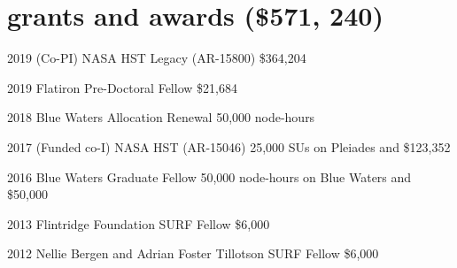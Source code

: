 \documentclass[]{luger-cv} %
\begin{document}

\section{grants and awards { \small (\$571, 240)}}

\begin{entrylist}

\entry
{2019}
{(Co-PI) NASA HST Legacy (AR-15800)}
{\$364,204}
{%
\vspace*{-0.75em}
}

\entry
{2019}
{Flatiron Pre-Doctoral Fellow}
{\$21,684}
{%
\vspace*{-0.75em}
}


\entry
{2018}
{Blue Waters Allocation Renewal}
{50,000 node-hours}
{%
\vspace*{-0.75em}
}


\entry
{2017}
{(Funded co-I) NASA HST (AR-15046)}
{25,000 SUs on Pleiades and \$123,352}
{%
\vspace*{-0.75em}
}


\entry
{2016}
{Blue Waters Graduate Fellow}
{50,000 node-hours on Blue Waters and \$50,000}
{%
\vspace*{-0.75em}
}


\ifdefined \onepage \else
\entry
{2013}
{Flintridge Foundation SURF Fellow}
{\$6,000}
{%
\vspace*{-0.75em}}

\entry
{2012}
{Nellie Bergen and Adrian Foster Tillotson SURF Fellow}
{\$6,000}
{\vspace*{-0.75em}}
\fi


\end{entrylist}

\end{document}
